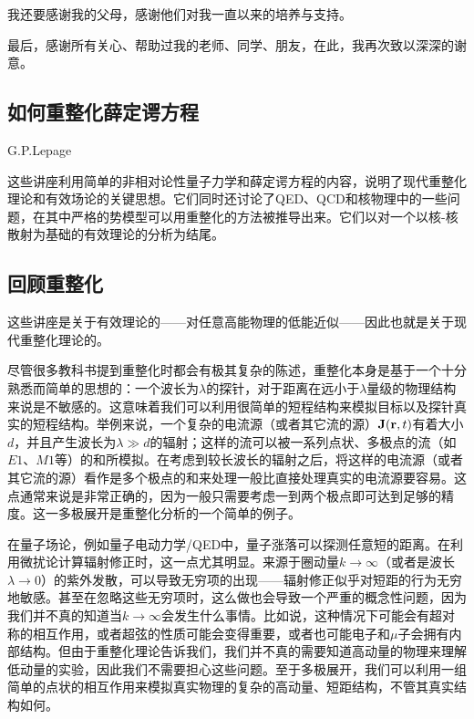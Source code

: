 \documentclass[cs4size,titlepage,twoside]{ctexart}
\begin{document}
我还要感谢我的父母，感谢他们对我一直以来的培养与支持。

最后，感谢所有关心、帮助过我的老师、同学、朋友，在此，我再次致以深深的谢意。

\cleardoublepage

\begin{appendices}
\renewcommand{\thesection}{\Alph{section}}
\section{如何重整化薛定谔方程}
\begin{center}
  G.P.Lepage
\end{center}
\begin{adjustwidth}{1cm}{1cm}
这些讲座利用简单的非相对论性量子力学和薛定谔方程的内容，说明了现代重整化理论和有效场论的关键思想。它们同时还讨论了QED、QCD和核物理中的一些问题，在其中严格的势模型可以用重整化的方法被推导出来。它们以对一个以核-核散射为基础的有效理论的分析为结尾。
\end{adjustwidth}
\subsection{回顾重整化}
这些讲座是关于有效理论的——对任意高能物理的低能近似——因此也就是关于现代重整化理论的。

尽管很多教科书提到重整化时都会有极其复杂的陈述，重整化本身是基于一个十分熟悉而简单的思想的：一个波长为$\lambda$的探针，对于距离在远小于$\lambda$量级的物理结构来说是不敏感的。这意味着我们可以利用很简单的短程结构来模拟目标以及探针真实的短程结构。举例来说，一个复杂的电流源（或者其它流的源）$\vb{J}(\vb{r},t)$有着大小$d$，并且产生波长为$\lambda\gg d$的辐射；这样的流可以被一系列点状、多极点的流（如$E1$、$M1$等）的和所模拟。在考虑到较长波长的辐射之后，将这样的电流源（或者其它流的源）看作是多个极点的和来处理一般比直接处理真实的电流源要容易。这点通常来说是非常正确的，因为一般只需要考虑一到两个极点即可达到足够的精度。这一多极展开是重整化分析的一个简单的例子。

在量子场论，例如量子电动力学/QED中，量子涨落可以探测任意短的距离。在利用微扰论计算辐射修正时，这一点尤其明显。来源于圈动量$k\rightarrow\infty$（或者是波长$\lambda\rightarrow0$）的紫外发散，可以导致无穷项的出现——辐射修正似乎对短距的行为无穷地敏感。甚至在忽略这些无穷项时，这么做也会导致一个严重的概念性问题，因为我们并不真的知道当$k\rightarrow\infty$会发生什么事情。比如说，这种情况下可能会有超对称的相互作用，或者超弦的性质可能会变得重要，或者也可能电子和$\mu$子会拥有内部结构。但由于重整化理论告诉我们，我们并不真的需要知道高动量的物理来理解低动量的实验，因此我们不需要担心这些问题。至于多极展开，我们可以利用一组简单的点状的相互作用来模拟真实物理的复杂的高动量、短距结构，不管其真实结构如何。


\end{appendices}
\end{document}
